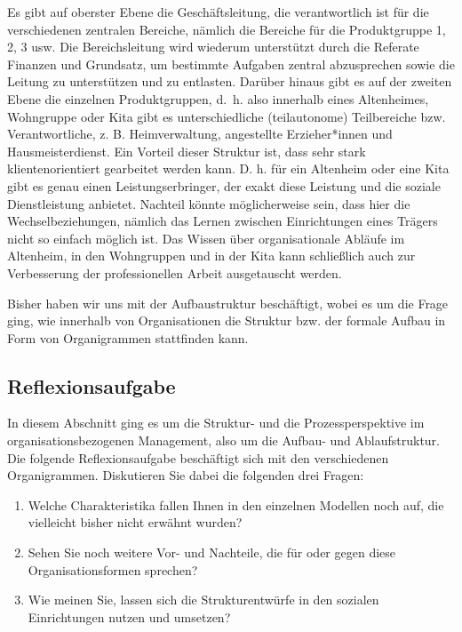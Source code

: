 \documentclass[
  letterpaper,
]{book}
\begin{document}
Es gibt auf oberster Ebene die Geschäftsleitung, die verantwortlich ist
für die verschiedenen zentralen Bereiche, nämlich die Bereiche für die
Produktgruppe 1, 2, 3 usw. Die Bereichsleitung wird wiederum unterstützt
durch die Referate Finanzen und Grundsatz, um bestimmte Aufgaben zentral
abzusprechen sowie die Leitung zu unterstützen und zu entlasten. Darüber
hinaus gibt es auf der zweiten Ebene die einzelnen Produktgruppen, d.~h.
also innerhalb eines Altenheimes, Wohngruppe oder Kita gibt es
unterschiedliche (teilautonome) Teilbereiche bzw. Verantwortliche, z. B.
Heimverwaltung, angestellte Erzieher*innen und Hausmeisterdienst. Ein
Vorteil dieser Struktur ist, dass sehr stark klientenorientiert
gearbeitet werden kann. D. h. für ein Altenheim oder eine Kita gibt es
genau einen Leistungserbringer, der exakt diese Leistung und die soziale
Dienstleistung anbietet. Nachteil könnte möglicherweise sein, dass hier
die Wechselbeziehungen, nämlich das Lernen zwischen Einrichtungen eines
Trägers nicht so einfach möglich ist. Das Wissen über organisationale
Abläufe im Altenheim, in den Wohngruppen und in der Kita kann
schließlich auch zur Verbesserung der professionellen Arbeit
ausgetauscht werden.

Bisher haben wir uns mit der Aufbaustruktur beschäftigt, wobei es um die
Frage ging, wie innerhalb von Organisationen die Struktur bzw. der
formale Aufbau in Form von Organigrammen stattfinden kann.

\subsection{Reflexionsaufgabe}\label{reflexionsaufgabe}

In diesem Abschnitt ging es um die Struktur- und die Prozessperspektive
im organisationsbezogenen Management, also um die Aufbau- und
Ablaufstruktur. Die folgende Reflexionsaufgabe beschäftigt sich mit den
verschiedenen Organigrammen. Diskutieren Sie dabei die folgenden drei
Fragen:

\begin{enumerate}
\def\labelenumi{\arabic{enumi}.}
\item
  Welche Charakteristika fallen Ihnen in den einzelnen Modellen noch
  auf, die vielleicht bisher nicht erwähnt wurden?
\item
  Sehen Sie noch weitere Vor- und Nachteile, die für oder gegen diese
  Organisationsformen sprechen?
\item
  Wie meinen Sie, lassen sich die Strukturentwürfe in den sozialen
  Einrichtungen nutzen und umsetzen?
\end{enumerate}
\end{document}
